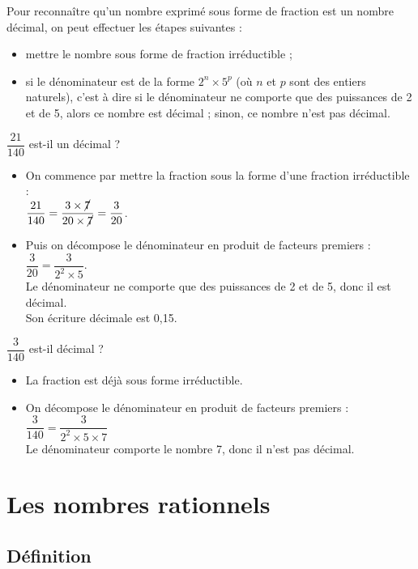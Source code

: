 \begin{methode*2*2}
Pour reconnaître qu'un nombre exprimé sous forme de fraction est un nombre décimal, on peut effectuer les étapes suivantes :
\begin{itemize}
   \item mettre le nombre sous forme de fraction irréductible ;
   \item si le dénominateur est de la forme $2^n\times5^p$ (où $n$ et $p$ sont des entiers naturels), c'est à dire si le dénominateur ne comporte que des puissances de 2 et de 5, alors ce nombre est décimal ; sinon, ce nombre n'est pas décimal. 
\end{itemize}
\exercice
   $\dfrac{21}{140}$ est-il un décimal ?
\correction
   \begin{itemize}
      \item On commence par mettre la fraction sous la forme d'une fraction irréductible : \\ [1mm] 
      $\dfrac{21}{140} =\dfrac{3\times\cancel7}{20\times\cancel7} =\dfrac{3}{20}$. \\ [-1mm]
      \item Puis on décompose le dénominateur en produit de facteurs premiers : $\dfrac{3}{20} =\dfrac{3}{2^2\times5}$. \\ [1mm] 
      Le dénominateur ne comporte que des puissances de 2 et de 5, donc il est décimal. \\
      Son écriture décimale est 0,15.
   \end{itemize}
\exercice
   $\dfrac{3}{140}$ est-il décimal ?
\correction
   \begin{itemize}
      \item La fraction est déjà sous forme irréductible.
      \item On décompose le dénominateur en produit de facteurs premiers : $\dfrac{3}{140} = \dfrac{3}{2^2\times5\times7}$ \\ [1mm]
      Le dénominateur comporte le nombre 7, donc il n'est pas décimal.
   \end{itemize}
\end{methode*2*2}


\pagebreak


\section{Les nombres rationnels} %

\subsection{Définition} %

